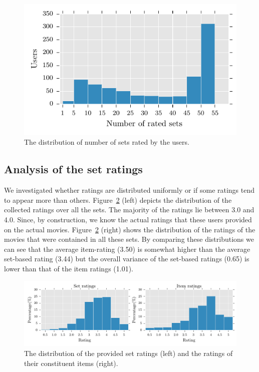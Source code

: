 \begin{figure}[bt]
  \centerline{\includegraphics[scale=0.9]{figures/usersetdist.pdf}}
  \caption{The distribution of number of sets rated by the users.}
  \label{fig:usersetdist}
\end{figure}


\subsection{Analysis of the set ratings}\label{ch:lfs:data_analysis}

We investigated whether ratings are distributed uniformly or if some ratings
tend to appear more than others.
Figure~\ref{fig:itemsetratingdist} (left) depicts
the distribution of the collected ratings over all the sets. 
The majority of the ratings lie between 3.0 and 4.0. 
Since, by construction, we know the actual ratings that these users provided on
the actual movies. Figure~\ref{fig:itemsetratingdist} (right) shows the
distribution of the ratings of the movies that were contained in all these sets.
By comparing these distributions we can see that the average item-rating (3.50) is
somewhat higher than the average set-based rating (3.44) but the overall variance of
the set-based ratings (0.65) is lower than that of the item ratings (1.01).

\begin{figure}[t]
  \centerline{\includegraphics[scale=0.82]{figures/itemsetrating_horiz.pdf}}
  \caption{The distribution of the provided set ratings (left) and the ratings of
  their constituent items (right).}
  \label{fig:itemsetratingdist}
\end{figure}



